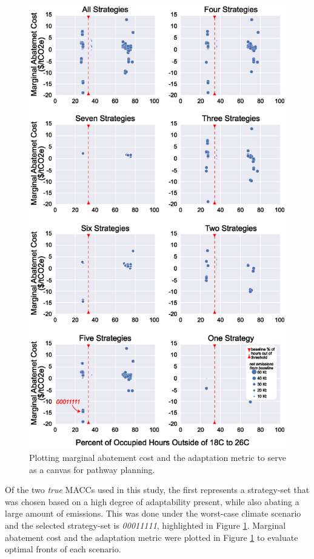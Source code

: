 \documentclass[twocolumn, a4paper,10pt]{article}
\begin{document}
\begin{figure}[t!]
    \centering
    \captionsetup{margin=.5cm}
    \includegraphics[scale=0.45]{figures/pareto_plots_585_box_update.eps}
    \caption{Plotting marginal abatement cost and the adaptation metric to serve as a canvas for pathway planning.}
    \label{fig:pareto_plot}
\end{figure}


Of the two \textit{true} MACCs used in this study, the first represents a strategy-set that was chosen based on a high degree of adaptability present, while also abating a large amount of emissions. This was done under the worst-case climate scenario and the selected strategy-set is \textit{00011111}, highlighted in Figure \ref{fig:pareto_plot}. Marginal abatement cost and the adaptation metric were plotted in Figure \ref{fig:pareto_plot} to evaluate optimal fronts of each scenario.
\end{document}
